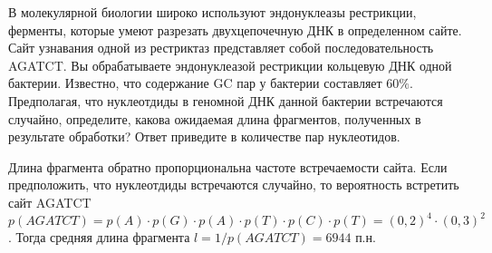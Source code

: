 
В молекулярной биологии
широко используют эндонуклеазы рестрикции, ферменты, которые умеют разрезать
двухцепочечную ДНК в определенном сайте. Сайт узнавания одной из рестриктаз
представляет собой последовательность AGATCT. Вы обрабатываете эндонуклеазой
рестрикции кольцевую ДНК одной бактерии. Известно, что содержание GC пар у
бактерии составляет $60\%$. 
Предполагая, что нуклеотдиды в геномной ДНК данной бактерии встречаются случайно, определите, какова ожидаемая длина фрагментов, полученных в
результате обработки? Ответ приведите в количестве пар нуклеотидов.

\solutionSection

Длина фрагмента обратно пропорциональна частоте встречаемости сайта. 
Если предположить, что нуклеотдиды встречаются случайно, то вероятность встретить 
сайт AGATCT $p(AGATCT)=p(A) \cdot p(G) \cdot p(A) \cdot p(T) \cdot p(C) \cdot p(T)= (0,2)^4 \cdot (0,3)^2$. 
Тогда средняя длина фрагмента $l=1/p(AGATCT) =  6944$ п.н.

